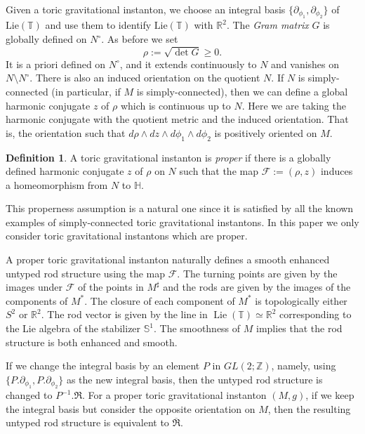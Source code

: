 \documentclass[a4paper,11pt]{amsart}
\theoremstyle{definition}
\newtheorem{definition}[theorem]{Definition}
\numberwithin{equation}{section}
\newcommand{\R}{\mathbb{R}}
\newcommand{\dT}{\mathbb{T}}
\newcommand{\dZ}{\mathbb{Z}}
\newcommand{\dS}{\mathbb{S}}
\newcommand{\mR} {\mathfrak R}
\DeclareMathOperator{\Lie}{Lie}
\begin{document}
Given a toric gravitational instanton, we choose an integral basis $\{\partial_{\phi_1},\partial_{\phi_2}\}$ of $\mathrm{Lie}(\dT)$  and use them to identify $\mathrm{Lie}(\dT)$ with $\mathbb{R}^2$. The \emph{Gram matrix} $G$ is globally defined on $N^\circ$.
As before we set $$\rho:=\sqrt{\det G}\geq0.$$ It is a priori defined on $N^\circ$, and it extends continuously to $N$ and vanishes on $N\setminus N^\circ$. There is also an induced orientation on the quotient $N$. If $N$ is simply-connected (in particular, if $M$ is simply-connected), then we can define a global harmonic conjugate $z$ of $\rho$ which is continuous up to $N$. Here we are taking the harmonic conjugate with the quotient metric and the induced orientation. That is, the orientation such that $d\rho\wedge dz\wedge d\phi_1\wedge d\phi_2$ is positively oriented on $M$. 


\begin{definition}
	A toric gravitational instanton is \emph{proper} if there is a globally defined harmonic conjugate $z$ of $\rho$ on $N$ such that  the map $\mathcal F:=(\rho, z)$ induces a homeomorphism from $N$ to $\mathbb H$. 
\end{definition}

	This properness assumption is a natural one since it is satisfied by all the known examples of simply-connected toric gravitational instantons.
    In this paper we only consider toric gravitational instantons which are proper. 





A proper  toric gravitational instanton naturally defines a smooth enhanced untyped rod structure  using the map $\mathcal F$. The turning points are given by the images under $\mathcal F$ of the points in $M^\sharp$ and the rods are given by the images of the components of $M^*$. The closure of each component of $M^*$ is topologically either $S^2$ or $\mathbb R^2$. The rod vector is given by the line in $\Lie(\dT)\simeq \R^2$ corresponding to the Lie algebra of the stabilizer $\dS^1$. The smoothness of $M$ implies that the rod structure is both enhanced and smooth.  

If we change the integral basis by an element $P$ in $GL(2;\dZ)$, namely, using $\{P.\partial_{\phi_1},P.\partial_{\phi_2}\}$ as  the new integral basis, then the untyped rod structure is changed to $P^{-1}.\mathfrak{R}$.
For a proper toric gravitational instanton $(M,g)$, if we keep the integral basis but consider the opposite orientation on $M$, then the  resulting  untyped rod structure is equivalent  to $\overline{\mR}$.
\end{document}
